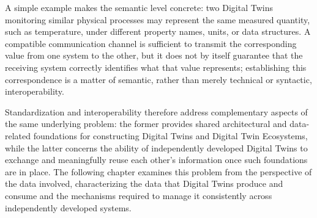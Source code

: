 A simple example makes the semantic level concrete: two Digital Twins monitoring similar physical processes may represent the same measured quantity, such as temperature, under different property names, units, or data structures. A compatible communication channel is sufficient to transmit the corresponding value from one system to the other, but it does not by itself guarantee that the receiving system correctly identifies what that value represents; establishing this correspondence is a matter of semantic, rather than merely technical or syntactic, interoperability.

Standardization and interoperability therefore address complementary aspects of the same underlying problem: the former provides shared architectural and data-related foundations for constructing Digital Twins and Digital Twin Ecosystems, while the latter concerns the ability of independently developed Digital Twins to exchange and meaningfully reuse each other's information once such foundations are in place. The following chapter examines this problem from the perspective of the data involved, characterizing the data that Digital Twins produce and consume and the mechanisms required to manage it consistently across independently developed systems.